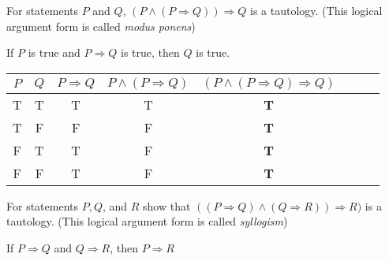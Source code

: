 \begin{defi}
    For statements $P$ and $Q$, $(P \wedge (P \Rightarrow Q)) \Rightarrow Q$ 
    is a tautology. (This logical argument form is called \emph{modus ponens})
    \medbreak
    \begin{center}
        If $P$ is true and $P \Rightarrow Q$ is true, then $Q$ is true.
    \end{center}
    \begin{center}
        \begin{tabular}{cccccccc}
          \toprule
          $P$ & $Q$ &$P \Rightarrow Q$ & $P \wedge (P \Rightarrow Q)$ 
          & $(P \wedge (P \Rightarrow Q) \Rightarrow Q)$ & \\
          \midrule
          T & T & T & T & \textbf{T}  \\
          T & F & F & F & \textbf{T}  \\
          F & T & T & F & \textbf{T}  \\
          F & F & T & F & \textbf{T}  \\
          \bottomrule
        \end{tabular}
      \end{center}
\end{defi}
\begin{defi}[Syllogism]
    For statements $P,Q$, and $R$ show that 
    $((P \Rightarrow Q) \wedge (Q \Rightarrow R)) \Rightarrow R)$ 
    is a tautology. (This logical argument form is called \emph{syllogism})
    \medbreak
    \begin{center}
        If $P \Rightarrow Q$ and $Q \Rightarrow R$, then $P \Rightarrow R$
    \end{center}
\end{defi}
